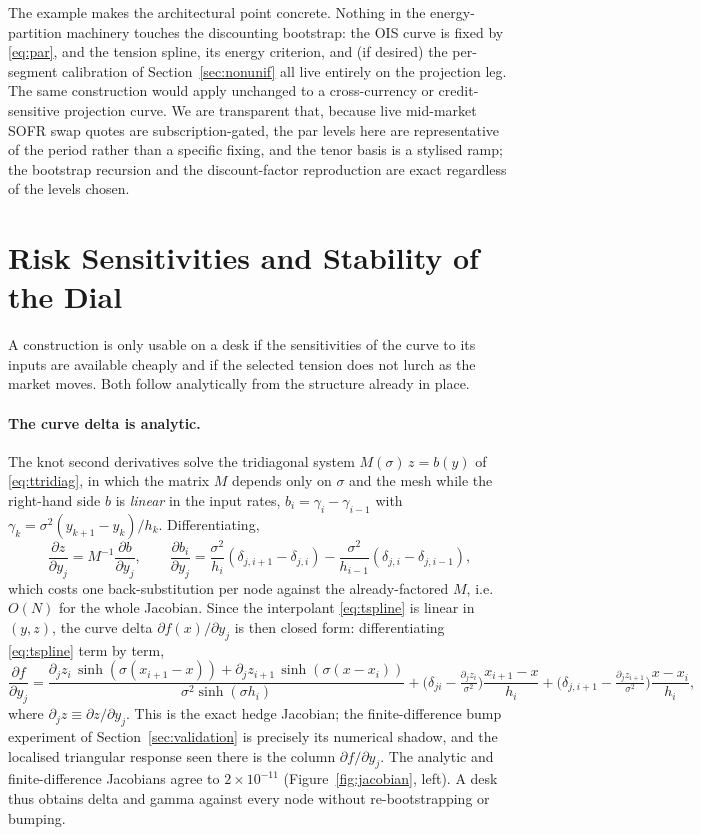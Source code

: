 \documentclass[10pt]{article}
\begin{document}
The example makes the architectural point concrete. Nothing in the energy-partition machinery
touches the discounting bootstrap: the OIS curve is fixed by \eqref{eq:par}, and the tension
spline, its energy criterion, and (if desired) the per-segment calibration of
Section~\ref{sec:nonunif} all live entirely on the projection leg. The same construction would
apply unchanged to a cross-currency or credit-sensitive projection curve. We are transparent
that, because live mid-market SOFR swap quotes are subscription-gated, the par levels here are
representative of the period rather than a specific fixing, and the tenor basis is a stylised
ramp; the bootstrap recursion and the discount-factor reproduction are exact regardless of the
levels chosen.

\section{Risk Sensitivities and Stability of the Dial}\label{sec:risk}
A construction is only usable on a desk if the sensitivities of the curve to its inputs are
available cheaply and if the selected tension does not lurch as the market moves. Both follow
analytically from the structure already in place.

\paragraph{The curve delta is analytic.} The knot second derivatives solve the tridiagonal
system $M(\sigma)\,z=b(y)$ of \eqref{eq:ttridiag}, in which the matrix $M$ depends only on
$\sigma$ and the mesh while the right-hand side $b$ is \emph{linear} in the input rates,
$b_i=\gamma_i-\gamma_{i-1}$ with $\gamma_k=\sigma^2(y_{k+1}-y_k)/h_k$. Differentiating,
\begin{equation}
\frac{\partial z}{\partial y_j}=M^{-1}\frac{\partial b}{\partial y_j},
\qquad
\frac{\partial b_i}{\partial y_j}=\frac{\sigma^2}{h_i}(\delta_{j,i+1}-\delta_{j,i})
-\frac{\sigma^2}{h_{i-1}}(\delta_{j,i}-\delta_{j,i-1}),
\label{eq:dzdy}
\end{equation}
which costs one back-substitution per node against the already-factored $M$, i.e.\ $O(N)$ for the
whole Jacobian. Since the interpolant \eqref{eq:tspline} is linear in $(y,z)$, the curve delta
$\partial f(x)/\partial y_j$ is then closed form: differentiating \eqref{eq:tspline} term by term,
\begin{equation}
\frac{\partial f}{\partial y_j}
=\frac{\partial_j z_i\,\sinh(\sigma(x_{i+1}-x))+\partial_j z_{i+1}\,\sinh(\sigma(x-x_i))}{\sigma^2\sinh(\sigma h_i)}
+\Big(\delta_{ji}-\tfrac{\partial_j z_i}{\sigma^2}\Big)\frac{x_{i+1}-x}{h_i}
+\Big(\delta_{j,i+1}-\tfrac{\partial_j z_{i+1}}{\sigma^2}\Big)\frac{x-x_i}{h_i},
\end{equation}
where $\partial_j z\equiv\partial z/\partial y_j$. This is the exact hedge Jacobian; the
finite-difference bump experiment of Section~\ref{sec:validation} is precisely its numerical
shadow, and the localised triangular response seen there is the column $\partial f/\partial y_j$.
The analytic and finite-difference Jacobians agree to $2\times10^{-11}$
(Figure~\ref{fig:jacobian}, left). A desk thus obtains delta and gamma against every node without
re-bootstrapping or bumping.
\end{document}
